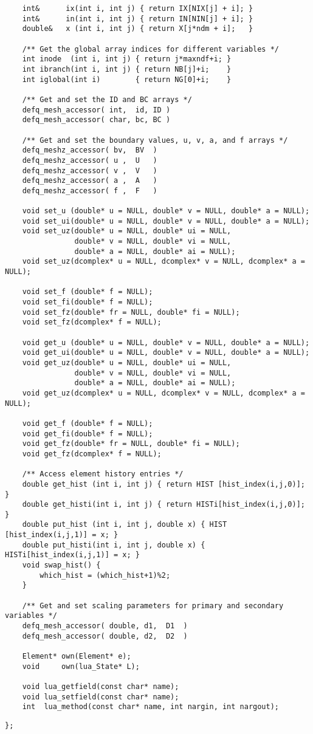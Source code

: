 \begin{verbatim}
    int&      ix(int i, int j) { return IX[NIX[j] + i]; }
    int&      in(int i, int j) { return IN[NIN[j] + i]; }
    double&   x (int i, int j) { return X[j*ndm + i];   }

    /** Get the global array indices for different variables */
    int inode  (int i, int j) { return j*maxndf+i; }
    int ibranch(int i, int j) { return NB[j]+i;    }
    int iglobal(int i)        { return NG[0]+i;    }

    /** Get and set the ID and BC arrays */
    defq_mesh_accessor( int,  id, ID )
    defq_mesh_accessor( char, bc, BC )

    /** Get and set the boundary values, u, v, a, and f arrays */
    defq_meshz_accessor( bv,  BV  )
    defq_meshz_accessor( u ,  U   )
    defq_meshz_accessor( v ,  V   )
    defq_meshz_accessor( a ,  A   )
    defq_meshz_accessor( f ,  F   )

    void set_u (double* u = NULL, double* v = NULL, double* a = NULL);
    void set_ui(double* u = NULL, double* v = NULL, double* a = NULL);
    void set_uz(double* u = NULL, double* ui = NULL,
                double* v = NULL, double* vi = NULL,
                double* a = NULL, double* ai = NULL);
    void set_uz(dcomplex* u = NULL, dcomplex* v = NULL, dcomplex* a = NULL);

    void set_f (double* f = NULL);
    void set_fi(double* f = NULL);
    void set_fz(double* fr = NULL, double* fi = NULL);
    void set_fz(dcomplex* f = NULL);

    void get_u (double* u = NULL, double* v = NULL, double* a = NULL);
    void get_ui(double* u = NULL, double* v = NULL, double* a = NULL);
    void get_uz(double* u = NULL, double* ui = NULL,
                double* v = NULL, double* vi = NULL,
                double* a = NULL, double* ai = NULL);
    void get_uz(dcomplex* u = NULL, dcomplex* v = NULL, dcomplex* a = NULL);

    void get_f (double* f = NULL);
    void get_fi(double* f = NULL);
    void get_fz(double* fr = NULL, double* fi = NULL);
    void get_fz(dcomplex* f = NULL);

    /** Access element history entries */
    double get_hist (int i, int j) { return HIST [hist_index(i,j,0)]; }
    double get_histi(int i, int j) { return HISTi[hist_index(i,j,0)]; }
    double put_hist (int i, int j, double x) { HIST [hist_index(i,j,1)] = x; }
    double put_histi(int i, int j, double x) { HISTi[hist_index(i,j,1)] = x; }
    void swap_hist() {
        which_hist = (which_hist+1)%2;
    }

    /** Get and set scaling parameters for primary and secondary variables */
    defq_mesh_accessor( double, d1,  D1  )
    defq_mesh_accessor( double, d2,  D2  )

    Element* own(Element* e);
    void     own(lua_State* L);

    void lua_getfield(const char* name);
    void lua_setfield(const char* name);
    int  lua_method(const char* name, int nargin, int nargout);

\end{verbatim}
\begin{verbatim}
};

\end{verbatim}
